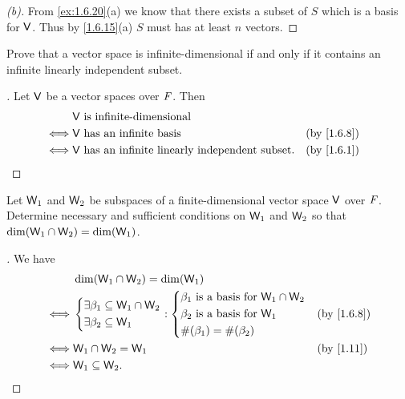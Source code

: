 \begin{proof}[(b)]
  From \cref{ex:1.6.20}(a) we know that there exists a subset of \(S\) which is a basis for \(\mathsf{V}\).
  Thus by \cref{1.6.15}(a) \(S\) must has at least \(n\) vectors.
\end{proof}

\begin{ex}\label{ex:1.6.21}
  Prove that a vector space is infinite-dimensional if and only if it contains an infinite linearly independent subset.
\end{ex}

\begin{proof}[]
  Let \(\mathsf{V}\) be a vector spaces over \(\mathit{F}\).
  Then
  \begin{align*}
         & \V \text{ is infinite-dimensional}                                                    \\
    \iff & \V \text{ has an infinite basis}                        &  & \text{(by \cref{1.6.8})} \\
    \iff & \V \text{ has an infinite linearly independent subset}. &  & \text{(by \cref{1.6.1})}
  \end{align*}
\end{proof}

\begin{ex}\label{ex:1.6.22}
  Let \(\mathsf{W}_1\) and \(\mathsf{W}_2\) be subspaces of a finite-dimensional vector space \(\mathsf{V}\) over \(\mathit{F}\).
  Determine necessary and sufficient conditions on \(\mathsf{W}_1\) and \(\mathsf{W}_2\) so that \(\dim(\mathsf{W}_1 \cap \mathsf{W}_2) = \dim(\mathsf{W}_1)\).
\end{ex}

\begin{proof}[]
  We have
  \begin{align*}
         & \dim(\W_1 \cap \W_2) = \dim(\W_1)                                                     \\
    \iff & \begin{dcases}
      \exists \beta_1 \subseteq \W_1 \cap \W_2 \\
      \exists \beta_2 \subseteq \W_1
    \end{dcases} : \begin{dcases}
      \beta_1 \text{ is a basis for } \W_1 \cap \W_2 \\
      \beta_2 \text{ is a basis for } \W_1           \\
      \#(\beta_1) = \#(\beta_2)
    \end{dcases} &  & \text{(by \cref{1.6.8})} \\
    \iff & \W_1 \cap \W_2 = \W_1                                   &  & \text{(by \cref{1.11})}  \\
    \iff & \W_1 \subseteq \W_2.
  \end{align*}
\end{proof}

